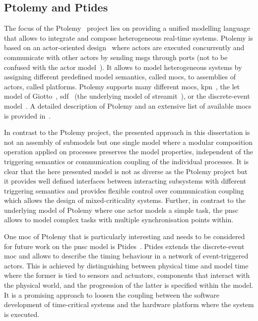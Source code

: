 \subsection{Ptolemy and Ptides}
\label{sect_related_coord_ptolemy}
The focus of the Ptolemy~\cite{eker2003} project lies on providing a unified modelling language that allows to integrate and compose heterogeneous real-time systems.
Ptolemy is based on an actor-oriented design~\cite{lee2003} where actors are executed concurrently and communicate with other actors by sending \glspl*{msg} through ports (not to be confused with the actor model~\cite{agha1985}).
It allows to model heterogeneous systems by assigning different predefined model semantics, called \glspl{moc}, to assemblies of actors, called platforms.
Ptolemy supports many different \glspl{moc}, \ia \gls{kpn}~\cite{kahn1974}, the \gls{let} model of Giotto~\cite{henzinger2001}, \gls{sdf}~\cite{lee1987} (\eg the underlying model of \gls*{streamit}~\cite{thies2002}), or the discrete-event model~\cite{lee1999}.
A detailed description of Ptolemy and an extensive list of available \glspl{moc} is provided in~\cite{ptolemaeus2014}.

In contrast to the Ptolemy project, the presented approach in this dissertation is not an assembly of submodels but one single model where a modular composition operation applied on processes preserves the model properties, independent of the triggering semantics or communication coupling of the individual processes.
It is clear that the here presented model is not as diverse as the Ptolemy project but it provides well defined interfaces between interacting subsystems with different triggering semantics and provides flexible control over communication coupling which allows the design of mixed-criticality systems.
Further, in contrast to the underlying model of Ptolemy where one actor models a simple task, the \gls{pnsc} allows to model complex tasks with multiple synchronisation points within.

One \gls{moc} of Ptolemy that is particularly interesting and needs to be considered for future work on the \gls{pnsc} model is Ptides~\cite{derler2008}.
Ptides extends the discrete-event \gls{moc} and allows to describe the timing behaviour in a network of event-triggered actors.
This is achieved by distinguishing between physical time and model time where the former is tied to sensors and actuators, \ie components that interact with the physical world, and the progression of the latter is specified within the model.
It is a promising approach to loosen the coupling between the software development of time-critical systems and the hardware platform where the system is executed.


